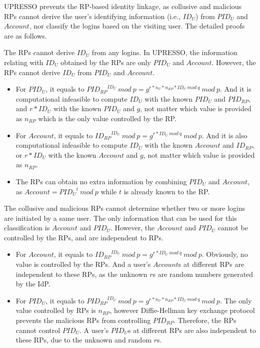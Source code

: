 UPRESSO prevents the RP-based identity linkage, as collusive and malicious RPs cannot derive the user's identifying information (i.e., $ID_U$) from $PID_U$ and $Account$, nor classify the logins based on the visiting user.
The detailed proofs are as follows.

The RPs cannot derive $ID_U$ from any logins. In UPRESSO, the information relating with $ID_U$ obtained by the RPs are only $PID_{U}$ and $Account$. However, the RPs cannot derive $ID_U$ from $PID_U$ and $Account$.
\begin{itemize}
  \item For $PID_U$, it equals to ${PID_{RP}}^{ID_U}\ mod\ p=g^{r*n_U*n_{RP}*ID_U\ mod\ q}\ mod\ p$. And it is computational infeasible to compute $ID_U$ with the known $PID_U$ and $PID_{RP}$, and $r*ID_U$ with the known $PID_U$ and $g$, not matter which value is provided  as $n_{RP}$ which is the only value controlled by the RP.
  \item For $Account$, it equals to ${ID_{RP}}^{ID_U}\ mod\ p=g^{r*ID_U\ mod\ q}\ mod\ p$. And it is also computational infeasible to compute $ID_U$ with the known $Account$ and $ID_{RP}$, or $r*ID_U$ with the known $Account$ and $g$, not matter which value is provided  as $n_{RP}$.
  \item The RPs can obtain no extra information by combining $PID_U$ and $Account$, as $Account= {PID_U}^t\ mod\ p$ while $t$ is already known to the RP.
\end{itemize}
 
The collusive and malicious RPs cannot determine whether two or more logins are initiated by a same user. The only information  that can be used for this
classification is $Account$ and $PID_U$. 
However,  the $Account$ and $PID_U$ cannot be controlled by the RPs, and are independent to RPs.
\begin{itemize}
  \item For $Account$, it equals to ${ID_{RP}}^{ID_U}\ mod\ p=g^{r*ID_U\ mod\ q}\ mod\ p$. Obviously, no value is controlled by the RPs. And a user's $Account$s at different RPs are independent to these RPs, as the unknown $r$s are   random numbers generated by the IdP. 
  \item For $PID_U$, it equals to ${PID_{RP}}^{ID_U}\ mod\ p=g^{r*n_U*n_{RP}*ID_U\ mod\ q}\ mod\ p$. The only value controlled by RPs is $n_{RP}$, however Diffie-Hellman key exchange protocol prevents the malicious RPs from controlling $PID_{RP}$. Therefore, the RPs cannot control $PID_U$. A user's $PID_U$s at different RPs are also independent to these RPs, due to the unknown and random $r$s.
\end{itemize}




